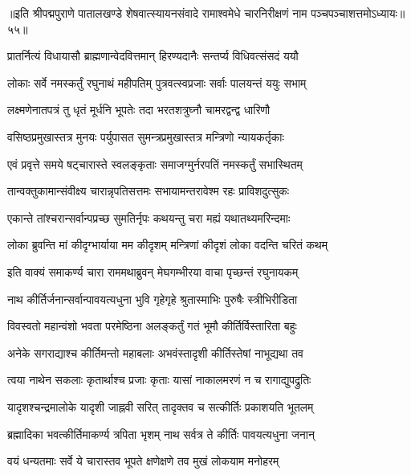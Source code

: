 {॥इति श्रीपद्मपुराणे पातालखण्डे शेषवात्स्यायनसंवादे रामाश्वमेधे चारनिरीक्षणं नाम पञ्चपञ्चाशत्तमोऽध्यायः॥५५॥}

\resetShloka


\twolineshloka
{प्रातर्नित्यं विधायासौ ब्राह्मणान्वेदवित्तमान्}
{हिरण्यदानैः सन्तर्प्य विधिवत्संसदं ययौ}%

\twolineshloka
{लोकाः सर्वे नमस्कर्तुं रघुनाथं महीपतिम्}
{पुत्रवत्स्वप्रजाः सर्वाः पालयन्तं ययुः सभाम्}%

\twolineshloka
{लक्ष्मणेनातपत्रं तु धृतं मूर्धनि भूपतेः}
{तदा भरतशत्रुघ्नौ चामरद्वन्द्व धारिणौ}%

\twolineshloka
{वसिष्ठप्रमुखास्तत्र मुनयः पर्युपासत}
{सुमन्त्रप्रमुखास्तत्र मन्त्रिणो न्यायकर्तृकाः}%

\twolineshloka
{एवं प्रवृत्ते समये षट्चारास्ते स्वलङ्कृताः}
{समाजग्मुर्नरपतिं नमस्कर्तुं सभास्थितम्}%

\twolineshloka
{तान्वक्तुकामान्संवीक्ष्य चारान्नृपतिसत्तमः}
{सभायामन्तरावेश्म रहः प्राविशदुत्सुकः}%

\twolineshloka
{एकान्ते तांश्चरान्सर्वान्पप्रच्छ सुमतिर्नृपः}
{कथयन्तु चरा मह्यं यथातथ्यमरिन्दमाः}%

\twolineshloka
{लोका ब्रुवन्ति मां कीदृग्भार्याया मम कीदृशम्}
{मन्त्रिणां कीदृशं लोका वदन्ति चरितं कथम्}%

\twolineshloka
{इति वाक्यं समाकर्ण्य चारा राममथाब्रुवन्}
{मेघगम्भीरया वाचा पृच्छन्तं रघुनायकम्}%


\twolineshloka
{नाथ कीर्तिर्जनान्सर्वान्पावयत्यधुना भुवि}
{गृहेगृहे श्रुतास्माभिः पुरुषैः स्त्रीभिरीडिता}%

\twolineshloka
{विवस्वतो महान्वंशो भवता परमेष्ठिना}
{अलङ्कर्तुं गतं भूमौ कीर्तिर्विस्तारिता बहुः}%

\twolineshloka
{अनेके सगराद्याश्च कीर्तिमन्तो महाबलाः}
{अभवंस्तादृशी कीर्तिस्तेषां नाभूद्यथा तव}%

\twolineshloka
{त्वया नाथेन सकलाः कृतार्थाश्च प्रजाः कृताः}
{यासां नाकालमरणं न च रागाद्युपद्रुतिः}%

\twolineshloka
{यादृशश्चन्द्रमालोके यादृशी जाह्नवी सरित्}
{तादृक्तव च सत्कीर्तिः प्रकाशयति भूतलम्}%

\twolineshloka
{ब्रह्मादिका भवत्कीर्तिमाकर्ण्य त्रपिता भृशम्}
{नाथ सर्वत्र ते कीर्तिः पावयत्यधुना जनान्}%

\twolineshloka
{वयं धन्यतमाः सर्वे ये चारास्तव भूपते}
{क्षणेक्षणे तव मुखं लोकयाम मनोहरम्}%

